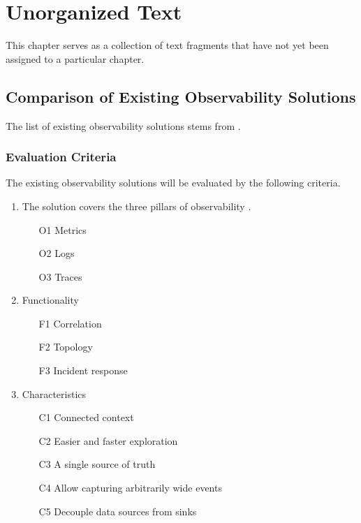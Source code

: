 \chapter{Unorganized Text}


This chapter serves as a collection of text fragments that have not yet been assigned to a particular chapter.

\section{Comparison of Existing Observability Solutions}

The list of existing observability solutions stems from \cite{9837035}.

\subsection{Evaluation Criteria}

The existing observability solutions will be evaluated by the following criteria.
\begin{enumerate}
    \item The solution covers the three pillars of observability \cite{9837035}.
    \begin{itemize}
        \item[O1]  Metrics
        \item[O2] Logs
        \item[O3] Traces
    \end{itemize}
    \item Functionality
    \begin{itemize}
        \item[F1] Correlation
        \item[F2] Topology
        \item[F3] Incident response
    \end{itemize}
    \item Characteristics
    \begin{itemize}
        \item[C1] Connected context
        \item[C2] Easier and faster exploration
        \item[C3] A single source of truth
        \item[C4] Allow capturing arbitrarily wide events
        \item[C5] Decouple data sources from sinks
    \end{itemize}
\end{enumerate}